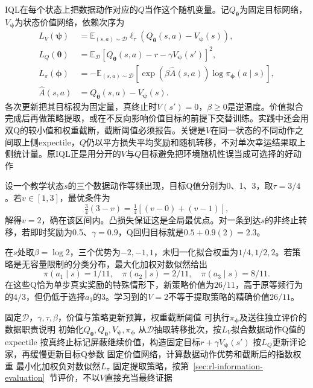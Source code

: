 IQL在每个状态上把数据动作对应的$Q$当作这个随机变量。记$Q_{\bar{\bm\theta}}$为固定目标网络，$V_{\bm\psi}$为状态价值网络，依赖次序为
\begin{align}
  \label{eq:rl-information-iql}
  L_V(\bm\psi)
    &=\mathbb E_{(s,a)\sim\mathcal D}
       \ell_\tau(Q_{\bar{\bm\theta}}(s,a)-V_{\bm\psi}(s)),\nonumber\\
  L_Q(\bm\theta)
    &=\mathbb E_{\mathcal D}
       [Q_{\bm\theta}(s,a)-r-\gamma V_{\bm\psi}(s')]^2,\nonumber\\
  L_\pi(\bm\phi)
    &=-\mathbb E_{(s,a)\sim\mathcal D}
       [\exp(\beta\widehat A(s,a))\log\pi_{\bm\phi}(a\mid s)],\\
  \widehat A(s,a)&=Q_{\bar{\bm\theta}}(s,a)-V_{\bm\psi}(s).
  \nonumber
\end{align}
各次更新把其目标视为固定量，真终止时$V(s')=0$，$\beta\geq0$是逆温度。价值拟合完成后再做策略提取，或在不反向影响价值目标的前提下交替训练。实践中还会用双Q的较小值和权重截断，截断阈值必须报告。关键是$V$在同一状态的不同动作之间取上侧expectile，$Q$仍以平方损失平均奖励和随机转移，不对单次幸运结果取上侧统计量。原IQL正是用分开的$V$与$Q$目标避免把环境随机性误当成可选择的好动作

\begin{example}[三个动作的IQL更新与提取]
  \label{ex:rl-information-iql}
  设一个教学状态$s$的三个数据动作等频出现，目标Q值分别为0、1、3，取$\tau=3/4$。若$v\in[1,3]$，最优条件为
  \[
    \tfrac34(3-v)=\tfrac14[(v-0)+(v-1)],
  \]
  解得$v=2$，确在该区间内。凸损失保证这是全局最优点。对一条到达$s$的非终止转移，若即时奖励为0.5、$\gamma=0.9$，Q回归目标就是$0.5+0.9(2)=2.3$。

  在$s$处取$\beta=\log2$，三个优势为$-2,-1,1$，未归一化拟合权重为$1/4,1/2,2$。若策略是无容量限制的分类分布，最大化加权对数似然给出
  \[
    \pi(a_1\mid s)=1/11,\quad
    \pi(a_2\mid s)=2/11,\quad
    \pi(a_3\mid s)=8/11.
  \]
  在这些Q恰为单步真实奖励的特殊情形下，新策略价值为$26/11$，高于原等频行为的$4/3$，但仍低于选择$a_3$的3。学习到的$V=2$不等于提取策略的精确价值$26/11$。
\end{example}

\begin{algorithm}[固定经验上的IQL与策略提取]
  \label{alg:rl-information-iql}
  \begin{algorithmic}[1]
    \Require 固定$\mathcal D$，$\gamma,\tau,\beta$，价值与策略更新预算，权重截断阈值
    \Ensure 可执行$\pi_{\bm\phi}$及送往独立评价的数据职责说明
    \State 初始化$Q_{\bm\theta},Q_{\bar{\bm\theta}},V_{\bm\psi},\pi_{\bm\phi}$
      \State 从$\mathcal D$抽取转移批次，按$L_V$拟合数据动作Q值的expectile
      \State 按真终止标记屏蔽继续价值，构造固定目标$r+\gamma V_{\bm\psi}(s')$
      \State 按$L_Q$更新评论家，再缓慢更新目标Q参数
    \EndFor
      \State 固定价值网络，计算数据动作优势和截断后的指数权重
      \State 最小化加权负对数似然$L_\pi$
    \EndFor
    \State 固定提取策略，按第~\ref{sec:rl-information-evaluation}~节评价，不以$V$直接充当最终证据
  \end{algorithmic}
\end{algorithm}

